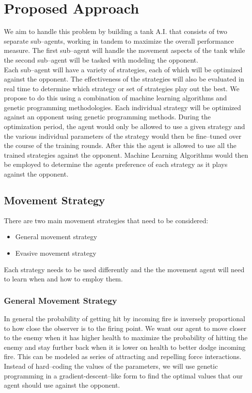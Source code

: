 \documentclass{article}
\theoremstyle{plain}
\theoremstyle{definition}
\theoremstyle{remark}
\begin{document}
\section*{Proposed Approach}

We aim to handle this problem by building a tank A.I. that consists of two separate sub--agents, working in tandem to maximize the overall performance measure. The first sub--agent will handle the movement aspects of the tank while the second sub--agent will be tasked with modeling the opponent.\\

Each sub--agent will have a variety of strategies, each of which will be optimized against the opponent. The effectiveness of the strategies will also be evaluated in real time to determine which strategy or set of strategies play out the best. We propose to do this using a combination of machine learning algorithms and genetic programming methodologies. Each individual strategy will be optimized against an opponent using genetic programming methods. During the optimization period, the agent would only be allowed to use a given strategy and the various individual parameters of the strategy would then be fine--tuned over the course of the training rounds. After this the agent is allowed to use all the trained strategies against the opponent. Machine Learning Algorithms would then be employed to determine the agents preference of each strategy as it plays against the opponent.

\subsection*{Movement Strategy}

There are two main movement strategies that need to be considered:
\begin{itemize}

\item General movement strategy

\item Evasive movement strategy
\end{itemize}

Each strategy needs to be used differently and the the movement agent will need to learn when and how to employ them.

\subsubsection*{General Movement Strategy}
In general the probability of getting hit by incoming fire is inversely proportional to how close the observer is to the firing point. We want our agent to move closer to the enemy when it has higher health to maximize the probability of hitting the enemy and stay further back when it is lower on health to better dodge incoming fire. This can be modeled as series of attracting and repelling force interactions. Instead of hard--coding the values of the parameters, we will use genetic programming in a gradient-descent--like form to find the optimal values that our agent should use against the opponent.
\end{document}
